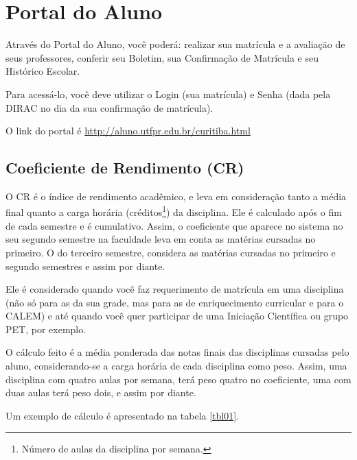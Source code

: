 \documentclass[a4paper,12pt,openany]{article}
\begin{document}
\newpage
\section{Portal do Aluno}

Através do Portal do Aluno, você poderá: realizar sua matrícula e a avaliação de seus professores, conferir seu Boletim, sua Confirmação de Matrícula e seu Histórico Escolar.

Para acessá-lo, você deve utilizar o Login (sua matrícula) e Senha (dada pela DIRAC no dia da sua confirmação de matrícula). 

O link do portal é \url{http://aluno.utfpr.edu.br/curitiba.html}



\subsection{Coeficiente de Rendimento (CR)}

O CR é o índice de rendimento acadêmico, e leva em consideração tanto a média final quanto a carga horária (créditos\footnote{Número de aulas da disciplina por semana.}) da disciplina. Ele é calculado após o fim de cada semestre e é cumulativo. Assim, o coeficiente que aparece no sistema no seu segundo semestre na faculdade leva em conta as matérias cursadas no primeiro. O do terceiro semestre, considera as matérias cursadas no primeiro e segundo semestres e assim por diante.

Ele é considerado quando você faz requerimento de matrícula em uma disciplina (não só para as da sua grade, mas para as de enriquecimento curricular e para o CALEM) e até quando você quer participar de uma Iniciação Científica ou grupo PET, por exemplo.

O cálculo feito é a média ponderada das notas finais das disciplinas cursadas pelo aluno, considerando-se a carga horária de cada disciplina como peso. Assim, uma disciplina com quatro aulas por semana, terá peso quatro no coeficiente, uma com duas aulas terá peso dois, e assim por diante.

Um exemplo de cálculo é apresentado na tabela \ref{tbl01}.
\end{document}
